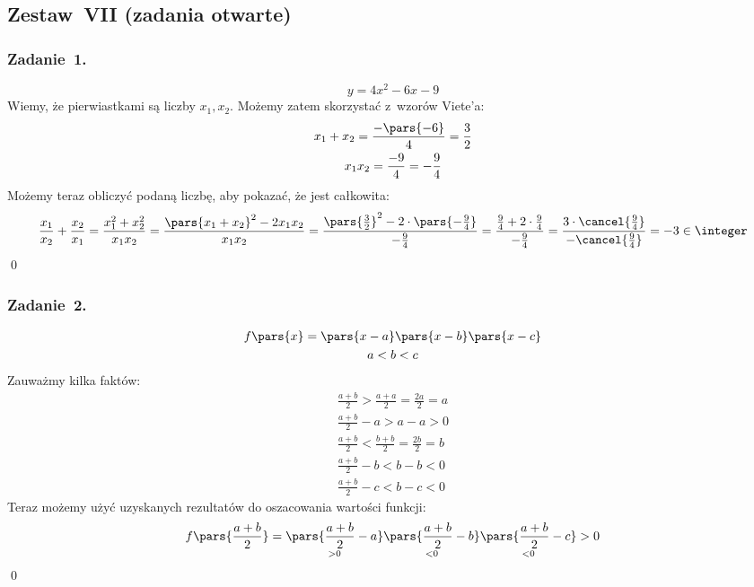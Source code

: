 \subsection*{Zestaw~VII (zadania otwarte)}
\subsubsection*{Zadanie~1.}
\begin{equation*}
    y = 4x^2 - 6x - 9
\end{equation*}
Wiemy, że pierwiastkami są liczby \(x_1, x_2\). Możemy zatem skorzystać z~wzorów Viete'a:
\begin{gather*}
    x_1 + x_2 = \frac{-\pars{-6}}{4} = \frac{3}{2}\\
    x_1x_2 = \frac{-9}{4} = -\frac{9}{4}
\end{gather*}
Możemy teraz obliczyć podaną liczbę, aby pokazać, że jest całkowita:
\begin{equation*}
    \frac{x_1}{x_2} + \frac{x_2}{x_1}
        = \frac{x_1^2 + x_2^2}{x_1x_2}
        = \frac{\pars{x_1 + x_2}^2 - 2x_1x_2}{x_1x_2}
        = \frac{\pars{\frac{3}{2}}^2 - 2 \cdot \pars{-\frac{9}{4}}}{-\frac{9}{4}}
        = \frac{\frac{9}{4} + 2 \cdot \frac{9}{4}}{-\frac{9}{4}}
        = \frac{3 \cdot \cancel{\frac{9}{4}}}{-\cancel{\frac{9}{4}}}
        = -3 \in \integer
\end{equation*}
\qed
\subsubsection*{Zadanie~2.}
\begin{gather*}
    f\pars{x} = \pars{x - a}\pars{x - b}\pars{x - c}\\
    a < b < c
\end{gather*}
Zauważmy kilka faktów:
\begin{gather*}
    \frac{a + b}{2} > \frac{a + a}{2} = \frac{2a}{2} = a\\
    \frac{a + b}{2} - a > a - a > 0\\
    \frac{a + b}{2} < \frac{b + b}{2} = \frac{2b}{2} = b\\
    \frac{a + b}{2} - b < b - b < 0\\
    \frac{a + b}{2} - c < b - c < 0
\end{gather*}
Teraz możemy użyć uzyskanych rezultatów do oszacowania wartości funkcji:
\begin{equation*}
    f\pars{\frac{a + b}{2}} = \underset{> 0}{\pars{\frac{a + b}{2} - a}}\underset{< 0}{\pars{\frac{a + b}{2} - b}}\underset{< 0}{\pars{\frac{a + b}{2} - c}} > 0
\end{equation*}
\qed
